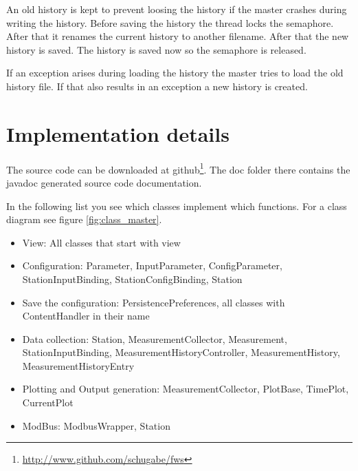 An old history is kept to prevent loosing the history if the master crashes during writing the history. Before saving the history the thread locks the semaphore. After that it renames the current history to another filename. After that the new history is saved. The history is saved now so the semaphore is released.

If an exception arises during loading the history the master tries to load the old history file. If that also results in an exception a new history is created.

\section{Implementation details} %
\label{sec:implementation_details}
The source code can be downloaded at github\footnote{\url{http://www.github.com/schugabe/fws}}. The doc folder there contains the javadoc generated source code documentation.

In the following list you see which classes implement which functions. For a class diagram see figure \ref{fig:class_master}.

\begin{itemize}
    \item View: All classes that start with view
    \item Configuration: Parameter, InputParameter, ConfigParameter, StationInputBinding, StationConfigBinding, Station
    \item Save the configuration: PersistencePreferences, all classes with ContentHandler in their name
    \item Data collection: Station, MeasurementCollector, Measurement, StationInputBinding, MeasurementHistoryController, MeasurementHistory, MeasurementHistoryEntry
    \item Plotting and Output generation: MeasurementCollector, PlotBase, TimePlot, CurrentPlot
    \item ModBus: ModbusWrapper, Station
\end{itemize}

